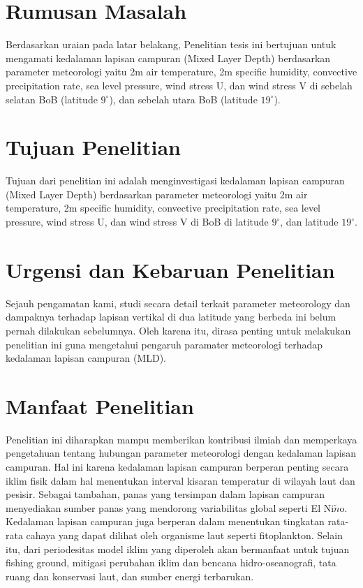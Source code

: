 \begin{spacing}{1.5}
	\section[Rumusan Masalah]{Rumusan Masalah}
	Berdasarkan uraian pada latar belakang, Penelitian tesis ini bertujuan untuk mengamati kedalaman lapisan campuran (Mixed Layer Depth)  berdasarkan parameter meteorologi yaitu 2m air temperature, 2m specific humidity, convective precipitation rate, sea level pressure, wind stress U, dan wind stress V di sebelah selatan BoB (latitude $9^\circ$), dan sebelah utara BoB (latitude $19^\circ$).
	
	\section[Tujuan Penelitian]{Tujuan Penelitian}
	
	Tujuan dari penelitian ini adalah menginvestigasi kedalaman lapisan campuran (Mixed Layer Depth)  berdasarkan parameter meteorologi yaitu 2m air temperature, 2m specific humidity, convective precipitation rate, sea level pressure, wind stress U, dan wind stress V di BoB di latitude $9^\circ$, dan latitude $19^\circ$. 
	
	\section[Urgensi dan Kebaruan Penelitian]{Urgensi dan Kebaruan Penelitian}

	Sejauh pengamatan kami, studi secara detail terkait parameter meteorology dan dampaknya terhadap lapisan vertikal di dua latitude yang berbeda ini belum pernah dilakukan sebelumnya. Oleh karena itu, dirasa penting untuk melakukan penelitian ini guna mengetahui pengaruh paramater meteorologi terhadap kedalaman lapisan campuran (MLD).

	\section[Manfaat Penelitian]{Manfaat Penelitian}
	
	Penelitian ini diharapkan mampu memberikan kontribusi ilmiah dan memperkaya pengetahuan tentang hubungan parameter meteorologi dengan kedalaman lapisan campuran. Hal ini karena kedalaman lapisan campuran berperan penting secara iklim fisik dalam hal menentukan interval kisaran temperatur di wilayah laut dan pesisir. Sebagai tambahan, panas yang tersimpan dalam  lapisan campuran menyediakan sumber panas yang mendorong variabilitas global seperti El Ni$\tilde{n}$o. Kedalaman lapisan campuran juga berperan dalam menentukan tingkatan rata-rata cahaya yang dapat dilihat oleh organisme laut seperti fitoplankton. Selain itu, dari periodesitas model iklim yang diperoleh akan bermanfaat untuk tujuan fishing ground, mitigasi perubahan iklim dan bencana hidro-oseanografi, tata ruang dan konservasi
	laut, dan sumber energi terbarukan. 


\end{spacing}
